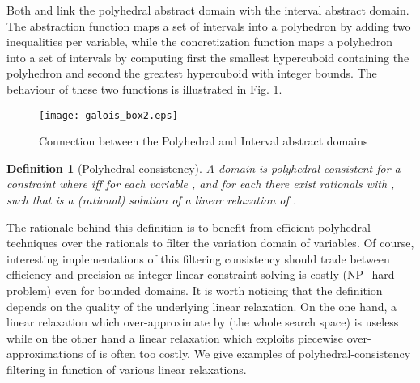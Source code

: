 \documentclass[submission,copyright,creativecommons]{eptcs}
\newtheorem{definition}{Definition}
\begin{document}
\noindent
Both  and  link the polyhedral abstract domain with the interval abstract domain.
The abstraction function  maps a set of intervals into a polyhedron by adding two inequalities per variable, while
the concretization function  maps a polyhedron into a set of intervals by computing first the smallest hypercuboid 
containing the polyhedron and second the greatest hypercuboid with integer bounds.
The behaviour of these two functions is illustrated in Fig. \ref{fig:galois_box}.


\begin{figure} 
  \begin{center} 
   \texttt{[image: galois\_box2.eps]} 
  \end{center} 
  \caption{Connection between the Polyhedral and Interval abstract domains} 
  \label{fig:galois_box} 
\end{figure} 


\begin{definition}[Polyhedral-consistency]
A domain  is polyhedral-consistent for a constraint  where  
iff for each variable ,  and for each 
there exist rationals  with , 
such that  is a (rational) solution of a linear relaxation of .
\end{definition} 
\noindent
The rationale behind this definition is to benefit from efficient polyhedral techniques over the rationals to filter 
the variation domain of variables. Of course, interesting implementations of this filtering consistency should trade 
between efficiency and precision as integer linear constraint solving is costly (NP\_hard problem) even for bounded domains.  
It is worth noticing that the definition depends on the quality of the underlying linear relaxation. On the one hand, a
linear relaxation which over-approximate  by  (the whole search space) is useless while on the other hand 
a linear relaxation which exploits piecewise over-approximations of  is often too costly. 
We give examples of polyhedral-consistency filtering in function of various linear relaxations.
\end{document}
